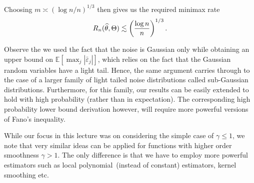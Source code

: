 \documentclass[12pt]{article}
\begin{document}
Choosing $m \asymp (\log n / n)^{1/3}$ then gives us the required minimax rate 
\begin{align}
R_n(\widehat{\theta}, \Theta) \lesssim \left( \frac{\log n}{n} \right)^{1/3}. 
\end{align}
\begin{remark}
	\label{remark:sub-Gaussian} Observe the we used the fact that the noise is Gaussian only while obtaining an upper bound on $\mathbb{E}[\max_j |\bar{\varepsilon}_j|]$, which relies on the fact that the Gaussian random variables have a light tail. Hence, the same argument carries through to the case of a larger family of light tailed noise distributions called sub-Gaussian distributions. Furthermore, for this family, our results can be easily extended to hold with high probability (rather than in expectation). The corresponding high probability lower bound derivation however, will require more powerful versions of Fano's inequality. 
\end{remark}
\begin{remark}
	\label{remark:higher-order-smoothness} While our focus in this lecture was on considering the simple case of $\gamma \leq 1$, we note that very similar ideas can be applied for functions with higher order smoothness $\gamma >1$. The only difference is that we have to employ more powerful estimators such as local polynomial~(instead of constant) estimators, kernel smoothing etc. 
\end{remark}
\end{document}
